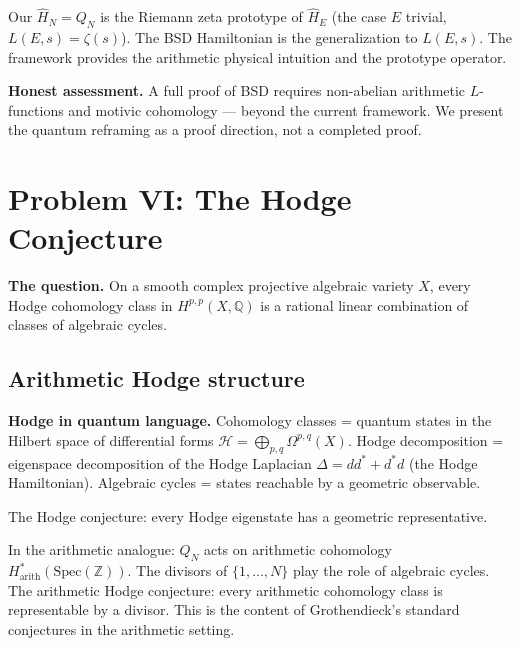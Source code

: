 \documentclass[12pt]{article}
\newcommand{\Hil}{\mathcal{H}}
\begin{document}
Our $\hat{H}_N = Q_N$ is the Riemann zeta prototype of $\hat{H}_E$
(the case $E$ trivial, $L(E,s) = \zeta(s)$).
The BSD Hamiltonian is the generalization to $L(E,s)$.
The framework provides the arithmetic physical intuition and the
prototype operator.

\begin{tcolorbox}[warnbox]
\textbf{Honest assessment.}
A full proof of BSD requires non-abelian arithmetic $L$-functions
and motivic cohomology --- beyond the current framework.
We present the quantum reframing as a proof direction,
not a completed proof.
\end{tcolorbox}

\section{Problem VI: The Hodge Conjecture}
\label{sec:hodge}

\textbf{The question.}
On a smooth complex projective algebraic variety $X$,
every Hodge cohomology class in $H^{p,p}(X,\mathbb{Q})$
is a rational linear combination of classes of algebraic cycles.

\subsection{Arithmetic Hodge structure}

\begin{tcolorbox}[qbox]
\textbf{Hodge in quantum language.}
Cohomology classes = quantum states in the Hilbert space of
differential forms $\Hil = \bigoplus_{p,q}\Omega^{p,q}(X)$.
Hodge decomposition = eigenspace decomposition of the Hodge Laplacian
$\Delta = dd^* + d^*d$ (the Hodge Hamiltonian).
Algebraic cycles = states reachable by a geometric observable.

The Hodge conjecture: every Hodge eigenstate has a geometric representative.

In the arithmetic analogue: $Q_N$ acts on arithmetic cohomology
$H^*_{\mathrm{arith}}(\mathrm{Spec}(\mathbb{Z}))$.
The divisors of $\{1,\ldots,N\}$ play the role of algebraic cycles.
The arithmetic Hodge conjecture: every arithmetic cohomology class is
representable by a divisor.
This is the content of Grothendieck's standard conjectures in the
arithmetic setting.
\end{tcolorbox}
\end{document}
